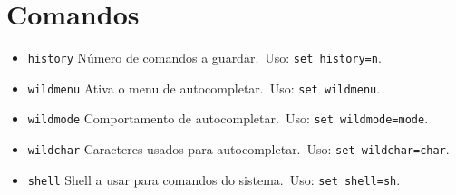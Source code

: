 \section{Comandos}

\begin{itemize}
    \item \texttt{history} Número de comandos a guardar.\ Uso: \texttt{set history=n}.
    \item \texttt{wildmenu} Ativa o menu de autocompletar.\ Uso: \texttt{set wildmenu}.
    \item \texttt{wildmode} Comportamento de autocompletar.\ Uso: \texttt{set wildmode=mode}.
    \item \texttt{wildchar} Caracteres usados para autocompletar.\ Uso: \texttt{set wildchar=char}.
    \item \texttt{shell} Shell a usar para comandos do sistema.\ Uso: \texttt{set shell=sh}.
\end{itemize}

